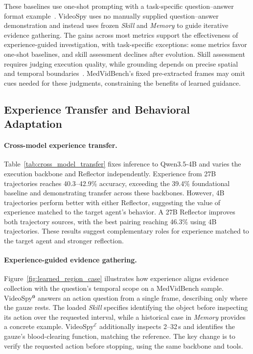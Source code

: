 \documentclass{article} %
\begin{document}
These baselines use one-shot prompting with a task-specific question--answer format example~\citep{su2026medgrpo}. VideoSpy uses no manually supplied question--answer demonstration and instead uses frozen \textit{Skill} and \textit{Memory} to guide iterative evidence gathering. The gains across most metrics support the effectiveness of experience-guided investigation, with task-specific exceptions: some metrics favor one-shot baselines, and skill assessment declines after evolution. Skill assessment requires judging execution quality, while grounding depends on precise spatial and temporal boundaries~\citep{su2026medgrpo}. MedVidBench's fixed pre-extracted frames may omit cues needed for these judgments, constraining the benefits of learned guidance.


\subsection{Experience Transfer and Behavioral Adaptation}
\label{sec:experience_analysis}

\paragraph{Cross-model experience transfer.}
Table~\ref{tab:cross_model_transfer} fixes inference to Qwen3.5-4B and varies the execution backbone and Reflector independently. Experience from 27B trajectories reaches 40.3--42.9\% accuracy, exceeding the 39.4\% foundational baseline and demonstrating transfer across these backbones. However, 4B trajectories perform better with either Reflector, suggesting the value of experience matched to the target agent's behavior. A 27B Reflector improves both trajectory sources, with the best pairing reaching 46.3\% using 4B trajectories. These results suggest complementary roles for experience matched to the target agent and stronger reflection.

\paragraph{Experience-guided evidence gathering.}
Figure~\ref{fig:learned_region_case} illustrates how experience aligns evidence collection with the question's temporal scope on a MedVidBench sample. VideoSpy$^{\mathbf{0}}$ answers an action question from a single frame, describing only where the gauze rests. The loaded \textit{Skill} specifies identifying the object before inspecting its action over the requested interval, while a historical case in \textit{Memory} provides a concrete example. VideoSpy$^{\mathcal{E}}$ additionally inspects 2--32\,s and identifies the gauze's blood-clearing function, matching the reference. The key change is to verify the requested action before stopping, using the same backbone and tools.
\end{document}
